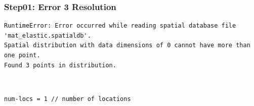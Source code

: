 \documentclass{beamer}
\begin{document}
\begin{frame}[fragile]
  \frametitle{Step01: Error 3 Resolution}

\begin{lstlisting}
RuntimeError: Error occurred while reading spatial database file 'mat_elastic.spatialdb'.
Spatial distribution with data dimensions of 0 cannot have more than one point.
Found 3 points in distribution.
\end{lstlisting}\pause
{} \pause\\
\begin{lstlisting}
num-locs = 1 // number of locations
\end{lstlisting}
  
\end{frame}
\end{document}
